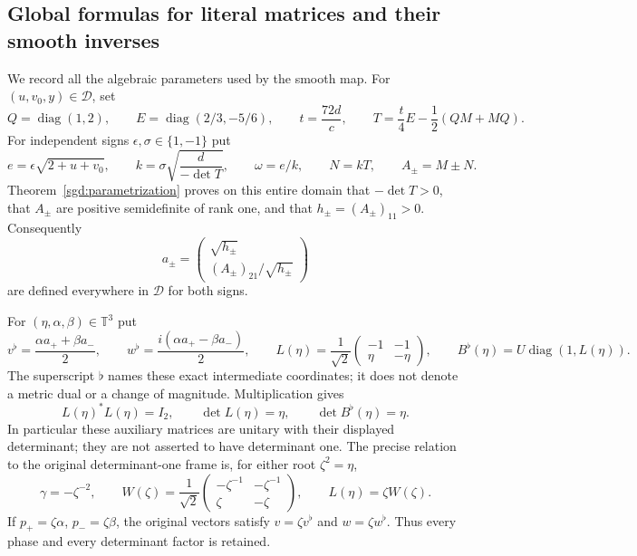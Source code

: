 \subsection{Global formulas for literal matrices and their smooth inverses}

We record all the algebraic parameters used by the smooth map.
For $(u,v_0,y)\in\mathcal D$, set
\[
 Q=\operatorname{diag}(1,2),\qquad E=\operatorname{diag}(2/3,-5/6),
 \qquad t=\frac{72d}{c},\qquad
 T=\frac t4E-\frac12(QM+MQ).
\]
For independent signs $\epsilon,\sigma\in\{1,-1\}$ put
\[
 e=\epsilon\sqrt{2+u+v_0},\qquad
 k=\sigma\sqrt{\frac d{-\det T}},\qquad
 \omega=e/k,\qquad N=kT,\qquad A_\pm=M\pm N.
\]
Theorem~\ref{sgd:parametrization} proves on this entire domain that
$-\det T>0$, that $A_\pm$ are positive semidefinite of rank one,
and that $h_\pm=(A_\pm)_{11}>0$. Consequently
\[
 a_\pm=\begin{pmatrix}\sqrt{h_\pm}\\
                 (A_\pm)_{21}/\sqrt{h_\pm}\end{pmatrix}
\]
are defined everywhere in $\mathcal D$ for both signs.

For $(\eta,\alpha,\beta)\in\mathbb T^3$ put
\[
 v^\flat=\frac{\alpha a_++\beta a_-}{2},\qquad
 w^\flat=\frac{i(\alpha a_+-\beta a_-)}{2},\qquad
 L(\eta)=\frac1{\sqrt2}\begin{pmatrix}-1&-1\\\eta&-\eta\end{pmatrix},
 \qquad B^\flat(\eta)=U\operatorname{diag}(1,L(\eta)).
\]
The superscript $\flat$ names these exact intermediate coordinates;
it does not denote a metric dual or a change of magnitude.
Multiplication gives
\[
 L(\eta)^*L(\eta)=I_2,\qquad
 \det L(\eta)=\eta,\qquad \det B^\flat(\eta)=\eta.
\]
In particular these auxiliary matrices are unitary with their
displayed determinant; they are not asserted to have determinant one.
The precise relation to the original determinant-one frame is,
for either root $\zeta^2=\eta$,
\[
 \gamma=-\zeta^{-2},\qquad
 W(\zeta)=\frac1{\sqrt2}
 \begin{pmatrix}-\zeta^{-1}&-\zeta^{-1}\\\zeta&-\zeta\end{pmatrix},
 \qquad L(\eta)=\zeta W(\zeta).
\]
If $p_+=\zeta\alpha$, $p_-=\zeta\beta$, the original vectors satisfy
$v=\zeta v^\flat$ and $w=\zeta w^\flat$.
Thus every phase and every determinant factor is retained.

